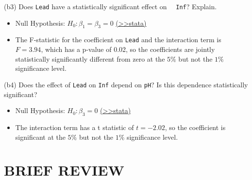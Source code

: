 \documentclass[
  10pt,
  ignorenonframetext,
]{beamer}
\providecommand{\tightlist}{%
  \setlength{\itemsep}{0pt}\setlength{\parskip}{0pt}}
\begin{document}
\begin{frame}[fragile]{(b3) Does \texttt{Lead} have a statistically
significant effect on ~~\texttt{Inf}? Explain.}
\protect\hypertarget{b3-does-lead-have-a-statistically-significant-effect-on-inf-explain.}{}
\begin{itemize}
\tightlist
\item
  Null Hypothesis: \(H_0: \beta_1 = \beta_3 = 0\)
  \footnotesize \protect\hyperlink{ex1-res4-FtestLead}{(\textgreater\textgreater stata)}
  \normalsize
\end{itemize}

\vspace{0.8mm}

\begin{itemize}
\tightlist
\item
  The F-statistic for the coefficient on \texttt{Lead} and the
  interaction term is \(F = 3.94\), which has a p-value of 0.02, so the
  coefficients are jointly statistically significantly different from
  zero at the \(5\%\) but not the \(1\%\) significance level.
\end{itemize}
\end{frame}

\begin{frame}{(b4) Does the effect of \texttt{Lead} on \texttt{Inf}
depend on \texttt{pH}? Is this dependence statistically significant?}
\protect\hypertarget{b4-does-the-effect-of-lead-on-inf-depend-on-ph-is-this-dependence-statistically-significant}{}
\begin{itemize}
\tightlist
\item
  Null Hypothesis: \(H_0: \beta_3 = 0\)
  \footnotesize \protect\hyperlink{ux5cux23ex1-res2-regLeadpH}{(\textgreater\textgreater stata)}
  \normalsize
\end{itemize}

\vspace{0.8mm}

\begin{itemize}
\tightlist
\item
  The interaction term has a t statistic of \(t = -2.02\), so the
  coefficient is significant at the \(5\%\) but not the \(1\%\)
  significance level.
\end{itemize}
\end{frame}

\hypertarget{brief-review}{%
\section{BRIEF REVIEW}\label{brief-review}}
\end{document}
